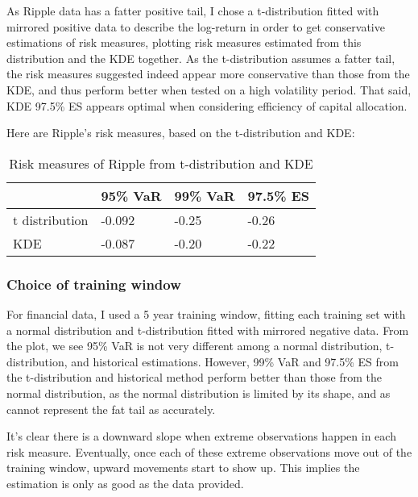 \documentclass{article}
\newcommand{\ciapdf}[1]{\resizebox{\textwidth}{!}{\texttt{[image: \#1]}}}
\begin{document}
As Ripple data has a fatter positive tail, I chose a t-distribution fitted with
mirrored positive data to describe the log-return in order to get conservative
estimations of risk measures, plotting risk measures estimated from this
distribution and the KDE together. As the t-distribution assumes a fatter tail,
the risk measures suggested indeed appear more conservative than those from the
KDE, and thus perform better when tested on a high volatility period. That
said, KDE 97.5\% ES appears optimal when considering efficiency of capital
allocation.

\ciapdf{assignment_1/report_pic/RippleKDEvsTRisk.pdf}

Here are Ripple's risk measures, based on the t-distribution and KDE:

\begin{table}[H]
    \centering
    \caption{Risk measures of Ripple from t-distribution and KDE}
    \begin{tabular}{|l|l|l|l|}
    \hline
                   & 95\% VaR & 99\% VaR & 97.5\% ES \\ \hline
    t distribution & -0.092   & -0.25    & -0.26     \\ \hline
    KDE            & -0.087   & -0.20    & -0.22     \\ \hline
    \end{tabular}
\end{table}

\subsubsection*{Choice of training window}

For financial data, I used a 5 year training window, fitting each training set
with a normal distribution and t-distribution fitted with mirrored negative
data. From the plot, we see 95\% VaR is not very different
among a normal distribution, t-distribution, and historical estimations.
However, 99\% VaR and 97.5\% ES from the t-distribution and historical method
perform better than those from the normal distribution, as the normal
distribution is limited by its shape, and as cannot represent the fat tail as
accurately.

It's clear there is a downward slope when extreme observations happen in each
risk measure. Eventually, once each of these extreme observations move out of the
training window, upward movements start to show up. This implies the
estimation is only as good as the data provided.
\end{document}
